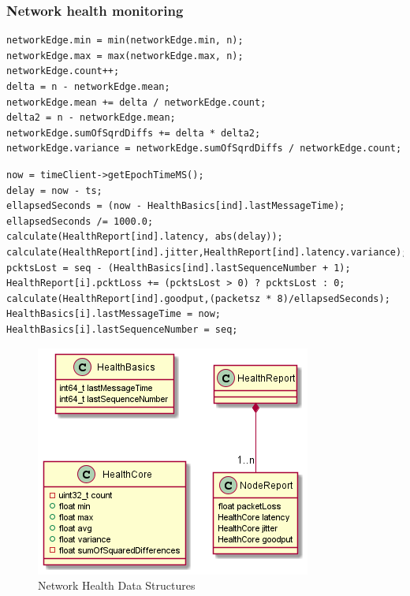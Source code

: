 \documentclass[letterpaper,twocolumn,12pt]{article}
\begin{document}
\subsubsection{Network health monitoring}\label{sec:nethealth}

\begin{lstlisting}[caption={calculate\_health(HealthCore \&networkEdge, n)}, label=code:calc, float=t]
networkEdge.min = min(networkEdge.min, n);
networkEdge.max = max(networkEdge.max, n);
networkEdge.count++;
delta = n - networkEdge.mean;
networkEdge.mean += delta / networkEdge.count;
delta2 = n - networkEdge.mean;
networkEdge.sumOfSqrdDiffs += delta * delta2;
networkEdge.variance = networkEdge.sumOfSqrdDiffs / networkEdge.count;
\end{lstlisting}

\begin{lstlisting}[caption={update\_health(ind, packetsz, ts, seq)},label=code:update, float=t] 
now = timeClient->getEpochTimeMS();
delay = now - ts;
ellapsedSeconds = (now - HealthBasics[ind].lastMessageTime);
ellapsedSeconds /= 1000.0;
calculate(HealthReport[ind].latency, abs(delay));
calculate(HealthReport[ind].jitter,HealthReport[ind].latency.variance);
pcktsLost = seq - (HealthBasics[ind].lastSequenceNumber + 1);
HealthReport[i].pcktLoss += (pcktsLost > 0) ? pcktsLost : 0;
calculate(HealthReport[ind].goodput,(packetsz * 8)/ellapsedSeconds);
HealthBasics[i].lastMessageTime = now;
HealthBasics[i].lastSequenceNumber = seq;
\end{lstlisting}

\begin{figure}[]
    \centering
    \includegraphics[width=\linewidth]{out/images/network_health/network_health.png}
    \caption{Network Health Data Structures}
    \label{fig:network_health_ds}
\end{figure}
\end{document}
